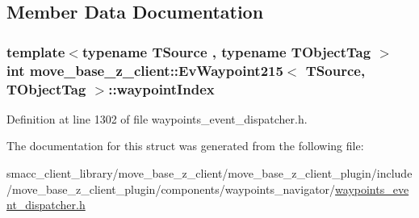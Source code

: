 \subsection{Member Data Documentation}
\subsubsection[{\texorpdfstring{waypoint\+Index}{waypointIndex}}]{\setlength{\rightskip}{0pt plus 5cm}template$<$typename T\+Source , typename T\+Object\+Tag $>$ int {\bf move\+\_\+base\+\_\+z\+\_\+client\+::\+Ev\+Waypoint215}$<$ T\+Source, T\+Object\+Tag $>$\+::waypoint\+Index}\hypertarget{structmove__base__z__client_1_1EvWaypoint215_a95b7cdf797b976e591be2df2def9f696}{}\label{structmove__base__z__client_1_1EvWaypoint215_a95b7cdf797b976e591be2df2def9f696}


Definition at line 1302 of file waypoints\+\_\+event\+\_\+dispatcher.\+h.



The documentation for this struct was generated from the following file\+:\begin{DoxyCompactItemize}
\item 
smacc\+\_\+client\+\_\+library/move\+\_\+base\+\_\+z\+\_\+client/move\+\_\+base\+\_\+z\+\_\+client\+\_\+plugin/include/move\+\_\+base\+\_\+z\+\_\+client\+\_\+plugin/components/waypoints\+\_\+navigator/\hyperlink{waypoints__event__dispatcher_8h}{waypoints\+\_\+event\+\_\+dispatcher.\+h}\end{DoxyCompactItemize}
